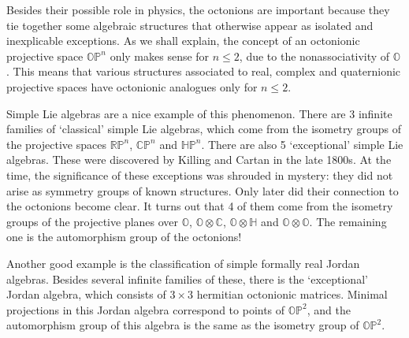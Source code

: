\documentclass[12pt]{article}
\newcommand\C{{\mathbb C}}
\renewcommand\H{{\mathbb H}}
\renewcommand\O{{\mathbb O}}
\newcommand\RP{{\mathbb {RP}}}
\newcommand\CP{{\mathbb {CP}}}
\newcommand\HP{{\mathbb {HP}}}
\newcommand\OP{{\mathbb {OP}}}
\newcommand{\tensor}{\otimes}
\begin{document}
Besides their possible role in physics, the octonions are important   
because they tie together some algebraic structures that otherwise   
appear as isolated and inexplicable exceptions.  As we shall explain,   
the concept of an octonionic projective space $\OP^n$ only makes sense   
for $n \le 2$, due to the nonassociativity of $\O$.  This means that   
various structures associated to real, complex and quaternionic   
projective spaces have octonionic analogues only for $n \le 2$.    
   
Simple Lie algebras are a nice example of this phenomenon.   There are  
3 infinite families of `classical' simple Lie algebras, which come from
the isometry groups of the projective spaces $\RP^n$, $\CP^n$ and   
$\HP^n$.  There are also 5 `exceptional' simple Lie algebras.   These 
were discovered by Killing and Cartan in the late 1800s.  At the time,
the significance of these exceptions was shrouded in mystery: they did
not arise as symmetry groups of known structures.  Only later did their
connection to the octonions become clear.  It turns out that 4 of them
come from the isometry groups of the projective planes over $\O$, $\O
\tensor \C$, $\O \tensor \H$ and $\O  \tensor \O$.  The remaining one is
the automorphism group of the octonions!   
   
Another good example is the classification of simple formally real
Jordan algebras.  Besides several infinite families of these, there
is the `exceptional' Jordan algebra, which consists of $3 \times 3$
hermitian octonionic matrices.   Minimal projections in this Jordan
algebra correspond to points of $\OP^2$, and the automorphism group of
this algebra is the same as the isometry group of $\OP^2$.   
   
\end{document}
